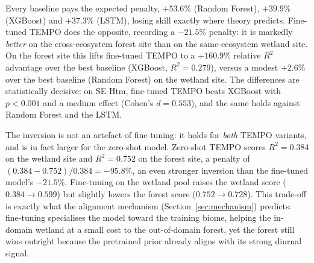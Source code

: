 \documentclass[sigconf]{acmart}          %
\begin{document}
Every baseline pays the expected penalty, $+53.6\%$ (Random Forest),
$+39.9\%$ (XGBoost) and $+37.3\%$ (LSTM), losing skill exactly where theory
predicts. Fine-tuned TEMPO does the opposite, recording a $-21.5\%$ penalty:
it is markedly \emph{better} on the cross-ecosystem forest site than on the
same-ecosystem wetland site. On the forest site this lifts fine-tuned TEMPO to
a $+160.9\%$ relative $R^2$ advantage over the best baseline (XGBoost,
$R^2=0.279$), versus a modest $+2.6\%$ over the best baseline (Random Forest)
on the wetland site. The differences are statistically decisive: on
SE-Htm, fine-tuned TEMPO beats XGBoost with $p<0.001$ and a medium effect
(Cohen's $d=0.553$), and the same holds against Random Forest and the LSTM.

The inversion is not an artefact of fine-tuning: it holds for \emph{both}
TEMPO variants, and is in fact larger for the zero-shot model. Zero-shot TEMPO
scores $R^2=0.384$ on the wetland site and $R^2=0.752$ on the forest site, a
penalty of $(0.384-0.752)/0.384 = -95.8\%$, an even stronger inversion than
the fine-tuned model's $-21.5\%$. Fine-tuning on the wetland pool raises the
wetland score ($0.384\rightarrow0.599$) but slightly lowers the forest score
($0.752\rightarrow0.728$). This trade-off is exactly what the alignment
mechanism (Section~\ref{sec:mechanism}) predicts: fine-tuning specialises the
model toward the training biome, helping the in-domain wetland at a small cost
to the out-of-domain forest, yet the forest still wins outright because the
pretrained prior already aligns with its strong diurnal signal.
\end{document}
